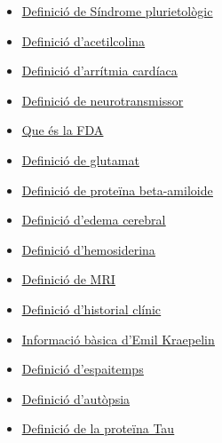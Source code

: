 \documentclass[a4paper,12pt]{article}
\begin{document}
\begin{itemize}
    \item \href{https://es.wikipedia.org/wiki/Síndrome}{\underline{ Definició de Síndrome plurietològic}}
    \item \href{https://www.cancer.gov/espanol/publicaciones/diccionarios/diccionario-cancer/def/acetilcolina}{\underline{Definició d'acetilcolina}}
    \item \href{https://medlineplus.gov/spanish/ency/article/001101.htm#:~:text=Es%20un%20trastorno%20de%20la,peligro%20inmediato%20para%20su%20salud.}{\underline{Definició d'arrítmia cardíaca}}
    \item \href{https://www.kenhub.com/es/library/anatomia-es/neurotransmisores}{\underline{Definició de neurotransmissor}}
    \item \href{https://www.ambit-bst.com/blog/qué-es-la-fda-y-cuáles-son-sus-funciones}{\underline{Que és la FDA}}
    \item \href{https://www.mentta.com/blog/que-es-el-glutamato/#:~:text=¿Qué%20es%20el%20glutamato%3F,partir%20de%20procesos%20de%20fermentación.}{\underline{Definició de glutamat}}
    \item \href{https://www.quimica.es/enciclopedia/Beta-amiloide.html}{\underline{Definició de proteïna beta-amiloide}}
    \item \href{https://bluenethospitals.com/health-library/edema-cerebral#:~:text=El%20Edema%20Cerebral%20se%20presenta,causando%20dolor%20en%20el%20paciente.}{\underline{Definició d'edema cerebral}}
    \item \href{http://www.neurocirugiacontemporanea.com/doku.php?id=hemosiderina}{\underline{Definició d'hemosiderina}}
    \item \href{https://www.nibib.nih.gov/science-education/science-topics/magnetic-resonance-imaging-mri}{\underline{Definició de MRI}}
    \item \href{https://www.igaleno.com/blog/que-es-historia-clinica/}{\underline{Definició d'historial clínic}}
    \item \href{https://www.ncbi.nlm.nih.gov/pmc/articles/PMC2927892/}{\underline{Informació bàsica d'Emil Kraepelin}}
    \item \href{https://ca.wikipedia.org/wiki/Espaitemps}{\underline{Definició d'espaitemps}}
    \item \href{https://peritojudicial.com/autopsia-necropsia/#Cu%E1l%20es%20la%20diferencia%20entre%20Autopsia%20y%20Necropsia%20%09}{\underline{Definició d'autòpsia}}
    \item \href{https://konexionalzheimer.com/la-proteina-tau-y-el-alzheimer/}{\underline{Definició de la proteïna Tau}}
\end{itemize}
\end{document}
